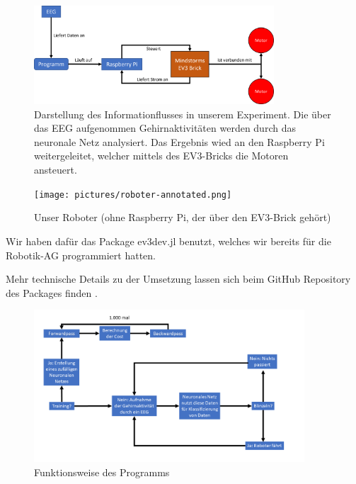 \documentclass[10pt]{scrartcl}
\begin{document}
	\begin{figure}[H]
		\centering
		\includegraphics[width=0.8\textwidth]{pictures/roboter-funktionsweise.png}
		\caption{Darstellung des Informationflusses in unserem Experiment. Die über das EEG aufgenommen Gehirnaktivitäten werden durch das neuronale Netz analysiert. Das Ergebnis wied an den Raspberry Pi weitergeleitet, welcher mittels des EV3-Bricks die Motoren ansteuert.}
		\label{robot-funktion}
	\end{figure}

	\begin{figure}[H]
		\centering
		\texttt{[image: pictures/roboter-annotated.png]}
		\caption{Unser Roboter (ohne Raspberry Pi, der über den EV3-Brick gehört)}
		\label{Robot}
	\end{figure}

	Wir haben dafür das Package ev3dev.jl benutzt, welches wir bereits für die Robotik-AG programmiert hatten.
	
	Mehr technische Details zu der Umsetzung lassen sich beim GitHub Repository des Packages finden \cite{ev3dev}.
	
	\begin{figure}[H]
		\centering
		\includegraphics[width=0.9\textwidth]{pictures/Abbildung-des-Programms.png}
		\caption{Funktionsweise des Programms}
		\label{Gesamtfunktion}
	\end{figure}

\end{document}
